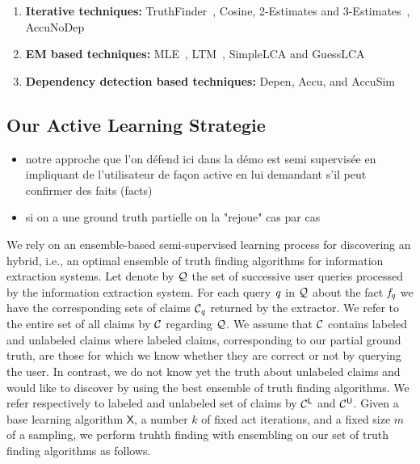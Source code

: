 \begin{enumerate}
 \item \textbf{Iterative techniques:} TruthFinder~\cite{YinHY08}, Cosine, 2-Estimates and 3-Estimates~\cite{GallandAMS10}, 
 AccuNoDep~\cite{DongBS09}
 \item \textbf{EM based techniques:} MLE~\cite{WangKLA12}, LTM~\cite{ZhaoRGH12}, SimpleLCA and GuessLCA~\cite{PasternackR13}
 \item \textbf{Dependency detection based techniques:} Depen, Accu, and AccuSim~\cite{DongBS09}
\end{enumerate}



\subsection{Our Active Learning Strategie}
\begin{itemize}
 \item notre approche que l'on défend ici dans la démo est  semi supervisée en impliquant de l'utilisateur de façon active
en lui demandant s'il peut confirmer des faits (facts)
\item si on a une ground truth partielle on la "rejoue" cas par cas
\end{itemize}

\medskip

We rely on an ensemble-based semi-supervised learning process for discovering an hybrid, i.e., an optimal ensemble of truth
finding algorithms for information extraction systems. Let denote by $\mathcal{Q}$ the set of successive user queries processed 
by the information extraction system. For each query $\mathit{q}$ in $\mathcal{Q}$ about the fact $\mathit{f}_{\mathit{q}}$ we have the corresponding
sets of claims $\mathcal{C}_{\mathit{q}}$ returned by the extractor. We refer to the entire set of all claims by $\mathcal{C}$ regarding $\mathcal{Q}$.
We assume that $\mathcal{C}$ contains labeled and unlabeled claims where labeled claims, corresponding to our partial ground truth, are those 
for which we  know whether they are correct or not by querying the user. In contrast, we do not know yet the truth about unlabeled claims and
would like to discover by using the best ensemble of truth finding algorithms. We refer respectively to labeled and unlabeled set of claims by 
$\mathcal{C}^{\mathsf{L}}$ and $\mathcal{C}^{\mathsf{U}}$. Given a base learning algorithm $\mathsf{X}$, a number $k$ of fixed act iterations, and 
a fixed size $m$ of a sampling, we perform truhth finding with ensembling on our set of truth finding algorithms as follows.

